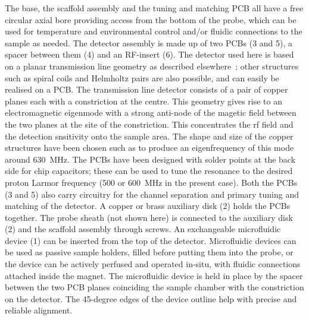 \documentclass[preprint,12pt]{article}
\begin{document}
The base, the scaffold assembly and the tuning and matching PCB all have a free circular 
axial bore providing access from the bottom of the probe, which can be used for 
temperature and environmental control and/or fluidic connections to the sample as
needed.
The detector assembly is made up of two PCBs (3 and 5), a spacer between them (4) and an 
RF-insert (6). The detector used here is based on a planar transmission line geometry 
as described elsewhere~\cite{gream_2016,stripline_jan}; other structures such as spiral
coils and Helmholtz pairs are also possible, and can easily be realised on a PCB.
The transmission line detector consists of a pair of copper 
planes each with a constriction at the centre.  This geometry gives rise to an 
electromagnetic eigenmode with a strong anti-node of the magetic field between
the two planes at the site of the constriction. This concentrates the rf field 
and the detection snsitivity
onto the sample area. 
The shape and size of the copper structures have been chosen such as to produce
an eigenfrequency of this mode around 630~MHz. The PCBs have been designed with
solder points at the back side for chip capacitors; these can be used to tune the
resonance to the desired proton Larmor frequency (500 or 600~MHz in the present case).
Both the PCBs (3 and 5) also carry circuitry for the channel separation and primary 
tuning and matching of the detector. A copper or brass auxiliary disk (2) holds the PCBs 
together. 
The probe sheath (not shown here) is connected to the auxiliary disk (2) 
and the scaffold assembly through screws. 
An exchangeable microfluidic device (1) can be inserted from the top of the detector. 
Microfluidic devices can be used as passive sample holders, filled before putting them
into the probe,
or the device can be actively perfused and operated in-situ, with fluidic connections 
attached inside the magnet. The microfluidic device is held in place by the spacer 
between the two PCB planes coinciding the sample chamber with the constriction on the 
detector.  The 45-degree edges of the device outline help with precise and reliable
alignment. 
\end{document}
